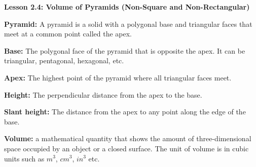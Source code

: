   \begin{center}
\textbf{Lesson 2.4: Volume of Pyramids (Non-Square and Non-Rectangular)}
\end{center}


     \textbf{Pyramid:} A pyramid is a solid with a polygonal base and triangular faces that meet at a common point called the apex.
     
     \textbf{Base:} The polygonal face of the pyramid that is opposite the apex. It can be triangular, pentagonal, hexagonal, etc.
     
     \textbf{Apex:} The highest point of the pyramid where all triangular faces meet.
     
     \textbf{Height:} The perpendicular distance from the apex to the base.
     
     \textbf{Slant height:} The distance from the apex to any point along the edge of the base.
     
     \textbf{Volume:} a mathematical quantity that shows the amount of three-dimensional space occupied by an object or a closed surface. The unit of volume is in cubic units such as $m^3$, $cm^3$, $in^3$ etc. 

 
